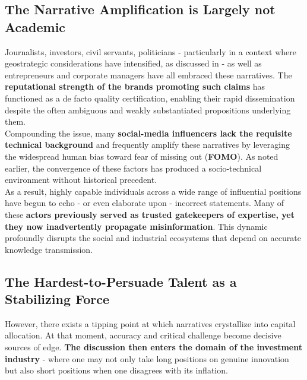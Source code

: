 \documentclass{article}
\begin{document}
\subsection{The Narrative Amplification is Largely not Academic}
\label{subsection: The narrative amplification is largely not academic}
Journalists, investors, civil servants, politicians - particularly in a context where geostrategic considerations have intensified, as discussed in \cite{EEN} - as well as entrepreneurs and corporate managers have all embraced these narratives. The \textbf{reputational strength of the brands promoting such claims} has functioned as a de facto quality certification, enabling their rapid dissemination despite the often ambiguous and weakly substantiated propositions underlying them.\\

Compounding the issue, many \textbf{social-media influencers lack the requisite technical background} and frequently amplify these narratives by leveraging the widespread human bias toward fear of missing out (\textbf{FOMO}). As noted earlier, the convergence of these factors has produced a socio-technical environment without historical precedent.\\

As a result, highly capable individuals across a wide range of influential positions have begun to echo - or even elaborate upon - incorrect statements. Many of these \textbf{actors previously served as trusted gatekeepers of expertise, yet they now inadvertently propagate misinformation}. This dynamic profoundly disrupts the social and industrial ecosystems that depend on accurate knowledge transmission.\\

\subsection{The Hardest-to-Persuade Talent as a Stabilizing Force}
\label{subsection: The hardest-to-persuade talent as a stabilizing force}

However, there exists a tipping point at which narratives crystallize into capital allocation. At that moment, accuracy and critical challenge become decisive sources of edge. \textbf{The discussion then enters the domain of the investment industry} - where one may not only take long positions on genuine innovation but also short positions when one disagrees with its inflation.\\
\end{document}
